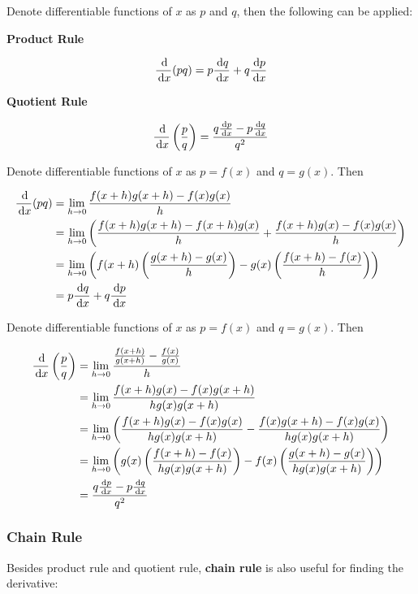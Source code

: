 \documentclass[a4paper,12pt]{article}
\begin{document}
\begin{thm}
  Denote differentiable functions of $x$ as $p$ and $q$, then the following can be applied:

  \begin{alist}
    \item \textbf{Product Rule}

    $$\frac{\,\mathrm{d}}{\,\mathrm{d} x}(pq)=p\frac{\,\mathrm{d} q}{\,\mathrm{d} x}+q\frac{\,\mathrm{d} p}{\,\mathrm{d} x}$$

    \item \textbf{Quotient Rule}

    $$\frac{\,\mathrm{d}}{\,\mathrm{d} x}\left( \frac{p}{q}\right)=\frac{q\frac{\,\mathrm{d} p}{\,\mathrm{d} x}-p\frac{\,\mathrm{d} q}{\,\mathrm{d} x}}{q^{2}}$$
  \end{alist}

  \prf{} Denote differentiable functions of $x$ as $p=f(x)$ and $q=g(x)$. Then

  $$\begin{aligned}[t]
    \frac{\,\mathrm{d}}{\,\mathrm{d} x}(pq)&=\lim_{h\to 0}\frac{f(x+h)g(x+h)-f(x)g(x)}{h}\\
    &=\lim_{h\to 0}\left( \frac{f(x+h)g(x+h)-f(x+h)g(x)}{h}+\frac{f(x+h)g(x)-f(x)g(x)}{h}\right)\\
    &=\lim_{h\to 0}\left( f(x+h)\left( \frac{g(x+h)-g(x)}{h}\right)-g(x)\left( \frac{f(x+h)-f(x)}{h}\right)\right)\\
    &=p\frac{\,\mathrm{d} q}{\,\mathrm{d} x}+q\frac{\,\mathrm{d} p}{\,\mathrm{d} x}
  \end{aligned}$$\s

   Denote differentiable functions of $x$ as $p=f(x)$ and $q=g(x)$. Then

  $$\begin{aligned}[t]
    \frac{\,\mathrm{d}}{\,\mathrm{d} x}\left( \frac{p}{q}\right)&=\lim_{h\to 0}\frac{\frac{f(x+h)}{g(x+h)}-\frac{f(x)}{g(x)}}{h}\\
    &=\lim_{h\to 0}\frac{f(x+h)g(x)-f(x)g(x+h)}{hg(x)g(x+h)}\\
    &=\lim_{h\to 0}\left( \frac{f(x+h)g(x)-f(x)g(x)}{hg(x)g(x+h)}-\frac{f(x)g(x+h)-f(x)g(x)}{hg(x)g(x+h)}\right)\\
    &=\lim_{h\to 0}\left( g(x)\left( \frac{f(x+h)-f(x)}{hg(x)g(x+h)}\right)-f(x)\left( \frac{g(x+h)-g(x)}{hg(x)g(x+h)}\right)\right)\\
    &=\frac{q\frac{\,\mathrm{d} p}{\,\mathrm{d} x}-p\frac{\,\mathrm{d} q}{\,\mathrm{d} x}}{q^{2}}
  \end{aligned}$$
\end{thm}

\subsubsection{Chain Rule}
Besides product rule and quotient rule, \textbf{chain rule} is also useful for finding the derivative:\n
\end{document}
